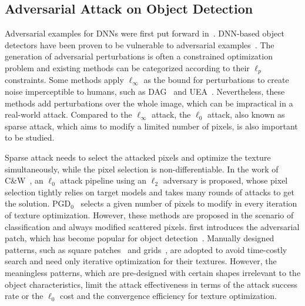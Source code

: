 \documentclass[times,twocolumn,final,authoryear]{elsarticle}
\begin{document}
\subsection{Adversarial Attack on Object Detection}

Adversarial examples for DNNs were first put forward in~\citep{szegedy2013intriguing}. DNN-based object detectors have been proven to be vulnerable to adversarial examples~\citep{carlini2017adversarial,lu2017adversarial,xie2017adversarial, wei2018transferable}. The generation of adversarial perturbations is often a constrained optimization problem and existing methods can be categorized according to their $\ell_p$ constraints. Some methods apply $\ell_\infty$ as the bound for perturbations to create noise imperceptible to humans, such as DAG~\citep{xie2017adversarial} and UEA~\citep{wei2018transferable}. Nevertheless, these methods add perturbations over the whole image, which can be impractical in a real-world attack. Compared to the $\ell_\infty$ attack, the $\ell_0$ attack, also known as sparse attack, which aims to modify a limited number of pixels, is also important to be studied. 

Sparse attack needs to select the attacked pixels and optimize the texture simultaneously, while the pixel selection is non-differentiable. In the work of C\&W~\citep{carlini2017towards}, an $\ell_0$ attack pipeline using an $\ell_2$ adversary is proposed, whose pixel selection tightly relies on target models and takes many rounds of attacks to get the solution. PGD$_0$~\citep{croce2019sparse} selects a given number of pixels to modify in every iteration of texture optimization. However, these methods are proposed in the scenario of classification and always modified scattered pixels. \citep{advpatch} first introduces the adversarial patch, which has become popular for object detection~\citep{liu2018dpatch,thys2019fooling,saha2019adversarial,wu2020dpattack}. Manually designed patterns, such as square patches~\citep{liu2018dpatch,thys2019fooling,saha2019adversarial} and grids~\citep{wu2020dpattack}, are adopted to avoid time-costly search and need only iterative optimization for their textures. However, the meaningless patterns, which are pre-designed with certain shapes irrelevant to the object characteristics, limit the attack effectiveness in terms of the attack success rate or the $\ell_0$ cost and the convergence efficiency for texture optimization. 





\end{document}
